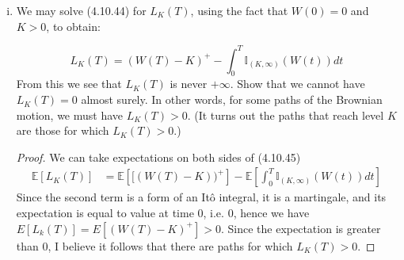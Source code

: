 \documentclass{article}
\newcommand{\E}{\mathbb{E}}
\theoremstyle{definition}
\theoremstyle{definition}
\begin{document}
\begin{enumerate}
\begin{enumerate}[(i)]
        \item We may solve (4.10.44) for $L_K(T)$, using the fact that $W(0)=0$ and $K>0$, to obtain:
        
          \begin{equation} L_K(T) = (W(T)-K)^+- \int_0^T \mathbb{I}_{(K,\infty)}(W(t))dt \tag{4.10.45}
          \end{equation}
        From this we see that $L_K(T)$ is never $+\infty$. Show that we cannot have $L_K(T)=0$ almost surely. In other words, for some paths of the Brownian motion, we must have $L_K(T)>0$. (It turns out the paths that reach level $K$ are those for which $L_K(T)>0$.)
        
        \begin{proof}
        We can take expectations on both sides of (4.10.45)
        \begin{align*}
            \E\left[ L_K(T) \right] & = \E\left[[(W(T)-K))^+ \right] - \E \left[ \int_0^T \mathbb{I}_{(K,\infty)}(W(t))dt\right]
        \end{align*}
        Since the second term is a form of an It\^{o} integral, it is a martingale, and its expectation is equal to value at time $0$, i.e. $0$, hence we have $E[L_k(T)]=E[(W(T)-K)^+]>0$. Since the expectation is greater than $0$, I believe it follows that there are paths for which $L_K(T)>0$.
        \end{proof}
        
    \end{enumerate}

\end{enumerate}
\end{document}
